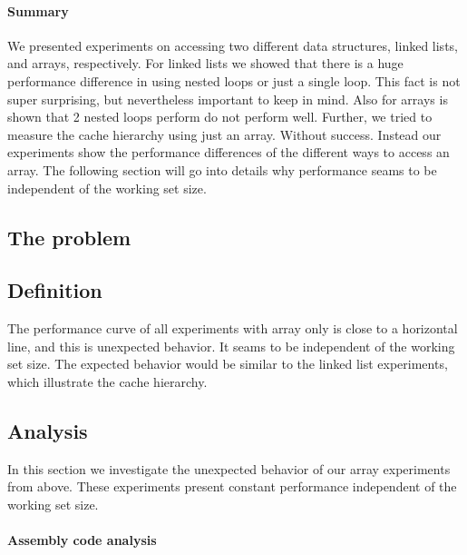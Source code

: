 \hypertarget{summary-1}{\paragraph{Summary}\label{summary-1}}

We presented experiments on accessing two different data structures,
linked lists, and arrays, respectively. For linked lists we showed that
there is a huge performance difference in using nested loops or just a
single loop. This fact is not super surprising, but nevertheless
important to keep in mind. Also for arrays is shown that 2 nested loops
perform do not perform well. Further, we tried to measure the cache
hierarchy using just an array. Without success. Instead our experiments
show the performance differences of the different ways to access an
array. The following section will go into details why performance seams
to be independent of the working set size.

\hypertarget{the-problem}{\subsection{The problem}\label{the-problem}}

\hypertarget{definition}{\subsection{Definition}\label{definition}}

The performance curve of all experiments with array only is close to a
horizontal line, and this is unexpected behavior. It seams to be
independent of the working set size. The expected behavior would be
similar to the linked list experiments, which illustrate the cache
hierarchy.

\subsection{Analysis}\label{analysis-1}

In this section we investigate the unexpected behavior of our array
experiments from above. These experiments present constant performance
independent of the working set size.

\hypertarget{assembly-code-analysis}{\paragraph{Assembly code
analysis}\label{assembly-code-analysis}}

